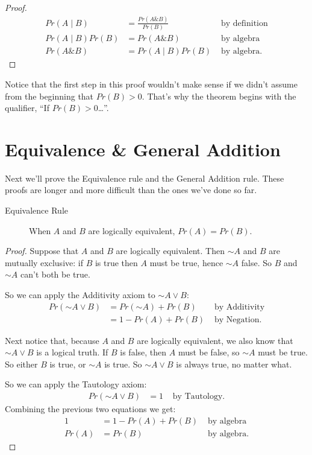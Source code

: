 \documentclass[justified]{tufte-book}
\newcommand{\given}{\mid}
\renewcommand{\neg}{\mathbin{\sim}}
\renewcommand{\wedge}{\mathbin{\&}}
\newcommand{\p}{Pr}
\theoremstyle{definition}
\theoremstyle{definition}
\theoremstyle{definition}
\theoremstyle{definition}
\theoremstyle{remark}
\begin{document}
\begin{proof}
{}
\[
  \begin{aligned}
  \p(A \given B)      &= \frac{\p(A \wedge B)}{\p(B)} & \mbox{ by definition}\\
  \p(A \given B)\p(B) &= \p(A \wedge B)               & \mbox{ by algebra}\\
  \p(A \wedge B)      &= \p(A \given B)\p(B)          & \mbox{ by algebra.}
  \end{aligned}
\]
\end{proof}

Notice that the first step in this proof wouldn't make sense if we didn't assume from the beginning that \(\p(B) > 0\). That's why the theorem begins with the qualifier, ``If \(\p(B) > 0\)\ldots{}''.

\hypertarget{equivalence-general-addition}{%
\section*{Equivalence \& General Addition}\label{equivalence-general-addition}}

Next we'll prove the Equivalence rule and the General Addition rule. These proofs are longer and more difficult than the ones we've done so far.

\begin{description}
\item[Equivalence Rule]
When \(A\) and \(B\) are logically equivalent, \(\p(A) = \p(B)\).
\end{description}

\begin{proof}
{}
Suppose that \(A\) and \(B\) are logically equivalent. Then \(\neg A\) and \(B\) are mutually exclusive: if \(B\) is true then \(A\) must be true, hence \(\neg A\) false. So \(B\) and \(\neg A\) can't both be true.

So we can apply the Additivity axiom to \(\neg A \vee B\):
\[
  \begin{aligned}
    \p(\neg A \vee B) &= \p(\neg A) + \p(B) & \mbox{ by Additivity}\\
                      &= 1 - \p(A) + \p(B)  & \mbox{ by Negation.}
  \end{aligned}
\]

Next notice that, because \(A\) and \(B\) are logically equivalent, we also know that \(\neg A \vee B\) is a logical truth. If \(B\) is false, then \(A\) must be false, so \(\neg A\) must be true. So either \(B\) is true, or \(\neg A\) is true. So \(\neg A \vee B\) is always true, no matter what.

So we can apply the Tautology axiom:
\[
  \begin{aligned}
    \p(\neg A \vee B) &= 1 & \mbox{ by Tautology.}
  \end{aligned}
\]
Combining the previous two equations we get:
\[
  \begin{aligned}
    1 &= 1 - \p(A) + \p(B) & \mbox{ by algebra}\\
    \p(A) &= \p(B) & \mbox{ by algebra}.
  \end{aligned}
\]
\end{proof}
\end{document}
